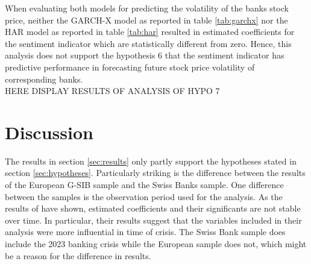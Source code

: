 

When evaluating both models for predicting the volatility of the banks stock price, neither the GARCH-X model as reported in table \ref{tab:garchx} nor the HAR model as reported in table \ref{tab:har} resulted in estimated coefficients for the sentiment indicator which are statistically different from zero. Hence, this analysis does not support the hypothesis 6 that the sentiment indicator has predictive performance in forecasting future stock price volatility of corresponding banks. \\





HERE DISPLAY RESULTS OF ANALYSIS OF HYPO 7




%
%
%


\section{Discussion}

The results in section \ref{sec:results} only partly support the hypotheses stated in section \ref{sec:hypotheses}. Particularly striking is the difference between the results of the European G-SIB sample and the Swiss Banks sample. One difference between the samples is the observation period used for the analysis. As the results of \cite{annaert2013} have shown, estimated coefficients and their significants are not stable over time. In particular, their results suggest that the variables included in their analysis were more influential in time of crisis. The Swiss Bank sample does include the 2023 banking crisis while the European sample does not, which might be a reason for the difference in results. \\

